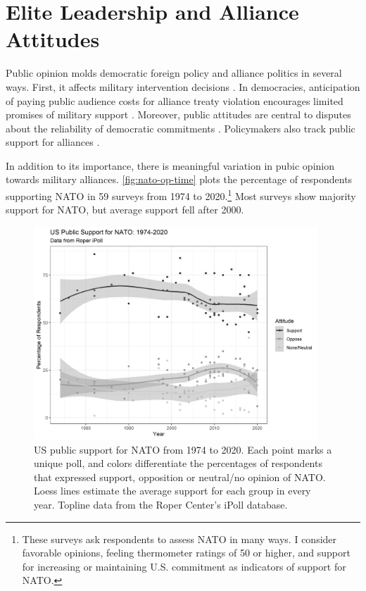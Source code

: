 \documentclass[12pt]{article}
\begin{document}


\section{Elite Leadership and Alliance Attitudes}


Public opinion molds democratic foreign policy and alliance politics in several ways.
First, it affects military intervention decisions \citep{Tomzetal2020, LinGreenberg2021}. 
In democracies, anticipation of paying public audience costs for alliance treaty violation encourages limited promises of military support \citep{Chibaetal2015, FjelstulReiter2019}. 
Moreover, public attitudes are central to disputes about the reliability of democratic commitments \citep{Gaubatz1996, GartzkeGleditsch2004}. 
Policymakers also track public support for alliances \citep{Sayle2019}. 


In addition to its importance, there is meaningful variation in pubic opinion towards military alliances. 
\autoref{fig:nato-op-time} plots the percentage of respondents supporting NATO in 59 surveys from 1974 to 2020.\footnote{These surveys ask respondents to assess NATO in many ways. I consider favorable opinions, feeling thermometer ratings of 50 or higher, and support for increasing or maintaining U.S. commitment as indicators of support for NATO.} 
Most surveys show majority support for NATO, but average support fell after 2000.  


\begin{figure}
	\centering
		\includegraphics[width=0.95\textwidth]{../figures/nato-op-time.png}
	\caption{US public support for NATO from 1974 to 2020. Each point marks a unique poll, and colors differentiate the percentages of respondents that expressed support, opposition or neutral/no opinion of NATO. Loess lines estimate the average support for each group in every year. Topline data from the Roper Center's iPoll database.}
	\label{fig:nato-op-time}
\end{figure}
\end{document}

